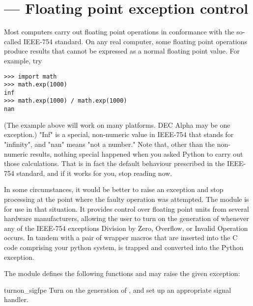 \section{ ---
         Floating point exception control}


Most computers carry out floating point operations
in conformance with the so-called IEEE-754 standard.
On any real computer,
some floating point operations produce results that cannot
be expressed as a normal floating point value.
For example, try

\begin{verbatim}
>>> import math
>>> math.exp(1000)
inf
>>> math.exp(1000) / math.exp(1000)
nan
\end{verbatim}

(The example above will work on many platforms.
DEC Alpha may be one exception.)
"Inf" is a special, non-numeric value in IEEE-754 that
stands for "infinity", and "nan" means "not a number."
Note that,
other than the non-numeric results,
nothing special happened when you asked Python
to carry out those calculations.
That is in fact the default behaviour prescribed in the IEEE-754 standard,
and if it works for you,
stop reading now.

In some circumstances,
it would be better to raise an exception and stop processing
at the point where the faulty operation was attempted.
The  module
is for use in that situation.
It provides control over floating point
units from several hardware manufacturers,
allowing the user to turn on the generation
of  whenever any of the
IEEE-754 exceptions Division by Zero, Overflow, or
Invalid Operation occurs.
In tandem with a pair of wrapper macros that are inserted
into the C code comprising your python system,
 is trapped and converted into the Python
 exception.

The  module defines the following functions and
may raise the given exception:

\begin{funcdesc}{turnon_sigfpe}{}
Turn on the generation of ,
and set up an appropriate signal handler.
\end{funcdesc}

